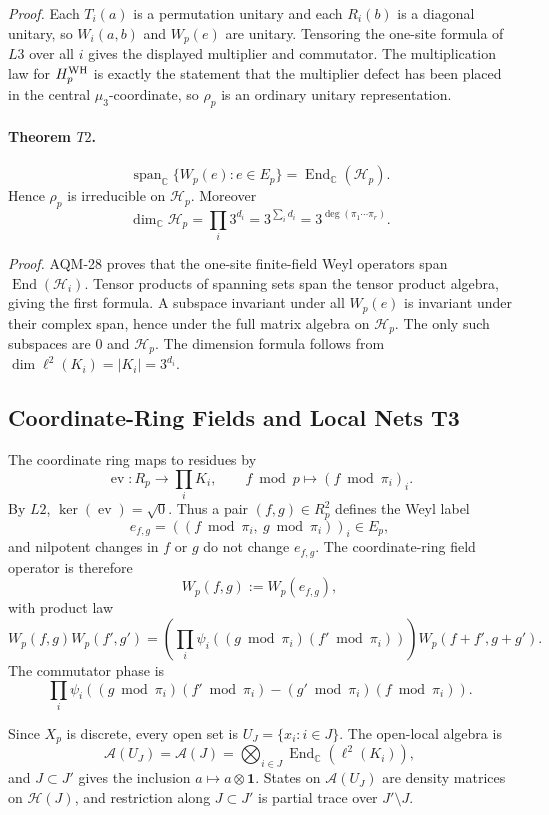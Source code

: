 \emph{Proof.}
Each \(T_i(a)\) is a permutation unitary and each \(R_i(b)\) is a diagonal
unitary, so \(W_i(a,b)\) and \(W_p(e)\) are unitary.  Tensoring the one-site
formula of \(L3\) over all \(i\) gives the displayed multiplier and
commutator.  The multiplication law for \(H_p^{\rm WH}\) is exactly the
statement that the multiplier defect has been placed in the central
\(\mu_3\)-coordinate, so \(\rho_p\) is an ordinary unitary representation.

\paragraph{Theorem \(T2\).}
\[
  \operatorname{span}_{\mathbb C}\{W_p(e):e\in E_p\}
  =
  \operatorname{End}_{\mathbb C}(\mathcal H_p).
\]
Hence \(\rho_p\) is irreducible on \(\mathcal H_p\).  Moreover
\[
  \dim_{\mathbb C}\mathcal H_p=\prod_i3^{d_i}
  =3^{\sum_i d_i}=3^{\deg(\pi_1\cdots\pi_r)}.
\]

\emph{Proof.}
AQM-28 proves that the one-site finite-field Weyl operators span
\(\operatorname{End}(\mathcal H_i)\).  Tensor products of spanning sets span
the tensor product algebra, giving the first formula.  A subspace invariant
under all \(W_p(e)\) is invariant under their complex span, hence under the
full matrix algebra on \(\mathcal H_p\).  The only such subspaces are \(0\)
and \(\mathcal H_p\).  The dimension formula follows from
\(\dim\ell^2(K_i)=|K_i|=3^{d_i}\).

\subsection{Coordinate-Ring Fields and Local Nets T3}

The coordinate ring maps to residues by
\[
  \operatorname{ev}:R_p\longrightarrow\prod_iK_i,\qquad
  f\bmod p\longmapsto (f\bmod\pi_i)_i.
\]
By \(L2\), \(\ker(\operatorname{ev})=\sqrt0\).  Thus a pair
\((f,g)\in R_p^2\) defines the Weyl label
\[
  e_{f,g}=((f\bmod\pi_i,\ g\bmod\pi_i))_i\in E_p,
\]
and nilpotent changes in \(f\) or \(g\) do not change \(e_{f,g}\).
The coordinate-ring field operator is therefore
\[
  W_p(f,g):=W_p(e_{f,g}),
\]
with product law
\[
  W_p(f,g)W_p(f',g')
  =
  \left(\prod_i\psi_i((g\bmod\pi_i)(f'\bmod\pi_i))\right)
  W_p(f+f',g+g').
\]
The commutator phase is
\[
  \prod_i\psi_i((g\bmod\pi_i)(f'\bmod\pi_i)
        -(g'\bmod\pi_i)(f\bmod\pi_i)).
\]

Since \(X_p\) is discrete, every open set is \(U_J=\{x_i:i\in J\}\).  The
open-local algebra is
\[
  \mathcal A(U_J)=\mathcal A(J)
  =\bigotimes_{i\in J}\operatorname{End}_{\mathbb C}(\ell^2(K_i)),
\]
and \(J\subset J'\) gives the inclusion \(a\mapsto a\otimes\mathbf1\).  States
on \(\mathcal A(U_J)\) are density matrices on \(\mathcal H(J)\), and
restriction along \(J\subset J'\) is partial trace over \(J'\setminus J\).

